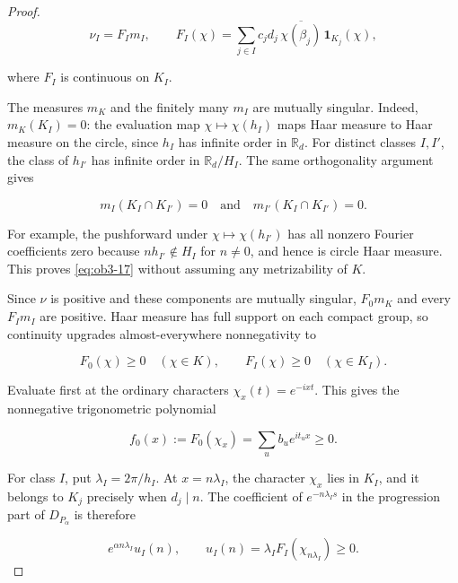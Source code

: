 \begin{proof}
\begin{equation}\label{eq:ob3-16}
\nu_I=F_I m_I,\qquad
F_I(\chi)=\sum_{j\in I}
c_jd_j\,\overline{\chi(\beta_j)}\,\mathbf1_{K_j}(\chi),
\end{equation}

where \(F_I\) is continuous on \(K_I\).

The measures \(m_K\) and the finitely many \(m_I\) are mutually singular. Indeed, \(m_K(K_I)=0\): the evaluation map \(\chi\mapsto\chi(h_I)\) maps Haar measure to Haar measure on the circle, since \(h_I\) has infinite order in \(\mathbb R_d\). For distinct classes \(I,I'\), the class of \(h_{I'}\) has infinite order in \(\mathbb R_d/H_I\). The same orthogonality argument gives

\begin{equation}\label{eq:ob3-17}
m_I(K_I\cap K_{I'})=0
\quad\text{and}\quad
m_{I'}(K_I\cap K_{I'})=0.
\end{equation}

For example, the pushforward under \(\chi\mapsto\chi(h_{I'})\) has all nonzero Fourier coefficients zero because \(nh_{I'}\notin H_I\) for \(n\ne0\), and hence is circle Haar measure. This proves \eqref{eq:ob3-17} without assuming any metrizability of \(K\).

Since \(\nu\) is positive and these components are mutually singular, \(F_0m_K\) and every \(F_Im_I\) are positive. Haar measure has full support on each compact group, so continuity upgrades almost-everywhere nonnegativity to

\begin{equation}\label{eq:ob3-18}
F_0(\chi)\ge0\quad(\chi\in K),\qquad
F_I(\chi)\ge0\quad(\chi\in K_I).
\end{equation}

Evaluate first at the ordinary characters \(\chi_x(t)=e^{-ixt}\). This gives the nonnegative trigonometric polynomial

\begin{equation}\label{eq:ob3-19}
f_0(x):=F_0(\chi_x)=\sum_u b_u e^{it_ux}\ge0.
\end{equation}

For class \(I\), put \(\lambda_I=2\pi/h_I\). At \(x=n\lambda_I\), the character \(\chi_x\) lies in \(K_I\), and it belongs to \(K_j\) precisely when \(d_j\mid n\). The coefficient of \(e^{-n\lambda_I s}\) in the progression part of \(D_{P_\alpha}\) is therefore

\begin{equation}\label{eq:ob3-20}
e^{\alpha n\lambda_I}u_I(n),\qquad
u_I(n)=\lambda_I F_I(\chi_{n\lambda_I})\ge0.
\end{equation}


\end{proof}
